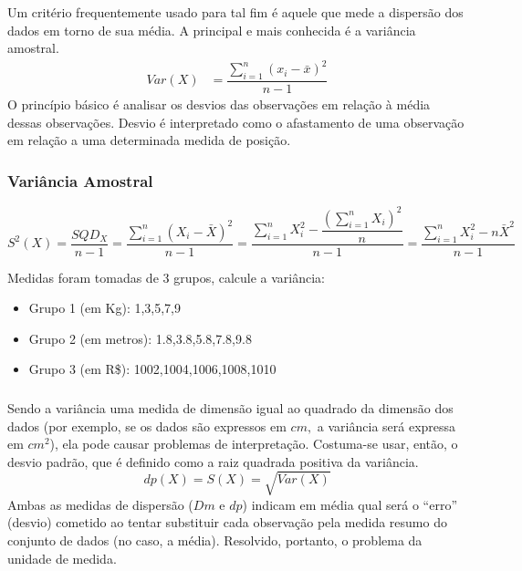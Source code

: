 \documentclass[14pt,aspectratio=1610]{beamer}
\begin{document}
\begin{frame}{}
\frametitle{}
\begin{block}{}
\justifying
Um critério frequentemente usado para tal fim é aquele que mede a dispersão dos dados em torno de sua média. A principal e mais conhecida é a variância amostral.
\begin{align*}
Var(X)&=\displaystyle \dfrac{{\displaystyle \sum_{i=1}^{n}(x_{i}-\bar{x})^{2}}}{n-1}
\end{align*}
O princípio básico é analisar os desvios das observações em relação à média dessas observações. Desvio é interpretado como o afastamento de uma observação em relação a uma determinada medida de posição.
\end{block}
\end{frame}

\begin{frame}{}
    \frametitle{Variância Amostral}
    \vspace{-0.5cm}
    \begin{block}{}
    \justifying
    \small
    \begin{equation*}
	S^2(X) = \dfrac{{SQD_X }}{{n - 1}} = \dfrac{{\sum\limits_{i = 1}^n {\left( {X_i  - \bar X} \right)^2 } }}{{n - 1}} = \dfrac{{\sum\limits_{i = 1}^n {X_i^2  - \dfrac{{\left( {\sum\limits_{i = 1}^n {X_i } } \right)^2 }}{n}} }}{{n - 1}}  = \dfrac{\sum\limits_{i = 1}^n {X_i^2  - n \bar{X}^2}}{n-1}
	\end{equation*}
    \end{block}
    \pause
    \begin{block}{}
    	\small
    Medidas foram tomadas de 3 grupos, calcule a variância:
    	\begin{itemize}
		\item Grupo 1 (em Kg): 1,3,5,7,9
		\item Grupo 2 (em metros): 1.8,3.8,5.8,7.8,9.8 
		\item Grupo 3 (em R\$): 1002,1004,1006,1008,1010
	\end{itemize}
    \end{block}
\end{frame}

\begin{frame}{}
\frametitle{}
\begin{block}{}
\justifying
Sendo a variância uma medida de dimensão igual ao quadrado da dimensão dos dados (por exemplo, se os dados são expressos em $cm,$ a variância será expressa 
em $cm^{2}$), ela pode causar problemas de interpretação. Costuma-se usar, então, o desvio padrão, que é definido como a raiz quadrada positiva da variância.
\begin{equation}
dp(X)=S(X)=\sqrt{Var(X)}
\end{equation}
Ambas as medidas de dispersão ($Dm$ e $dp$) indicam em média qual será o ``erro'' (desvio) cometido ao tentar substituir cada observação pela medida resumo do conjunto de dados (no caso, a média). Resolvido, portanto, o problema da unidade de medida.
\end{block}
\end{frame}
\end{document}
